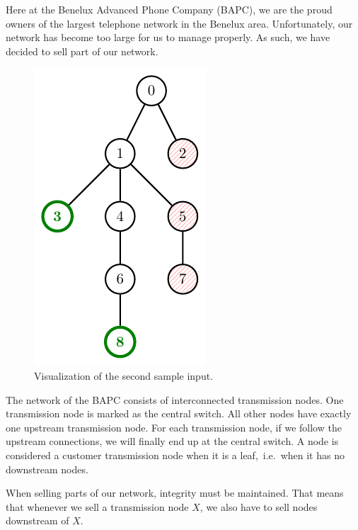 

\newcommand{\maxn}{10^6}

Here at the Benelux Advanced Phone Company (BAPC),
we are the proud owners of the largest telephone network in the Benelux area.
Unfortunately, our network has become too large for us to manage properly.
As such, we have decided to sell part of our network.

\begin{figure}
    \centering
    \includegraphics{figure.pdf}
    \caption{
        Visualization of the second sample input.
    }
    \label{fig:leaves}
\end{figure}

The network of the BAPC consists of interconnected transmission nodes.
One transmission node is marked as the central switch.
All other nodes have exactly one upstream transmission node.
For each transmission node, if we follow the upstream connections, we will finally end up at the central switch.
A node is considered a customer transmission node when it is a leaf,~i.e.~when it has no downstream nodes.

When selling parts of our network, integrity must be maintained.
That means that whenever we sell a transmission node $X$, we also have to sell
nodes downstream of $X$.

